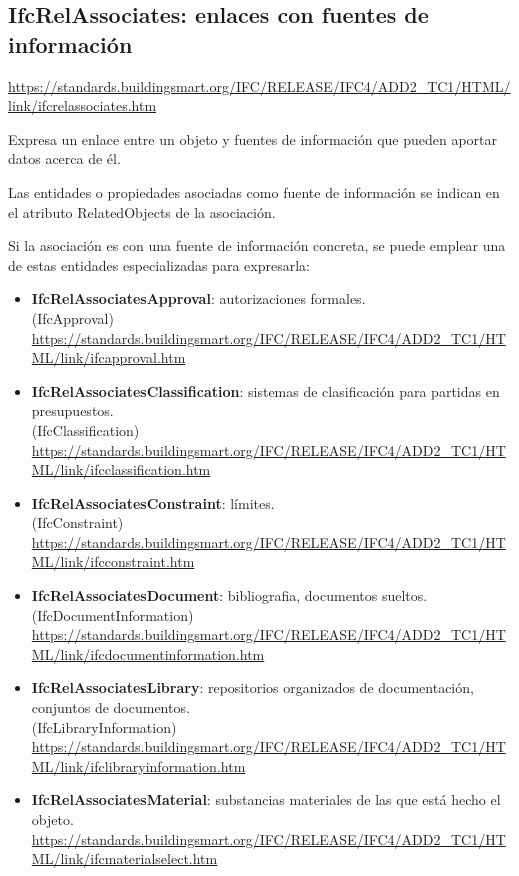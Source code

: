\documentclass[spanish,12pt,a4paper,final,oneside]{book}
\begin{document}
\subsection{IfcRelAssociates: enlaces con fuentes de información}
\url{https://standards.buildingsmart.org/IFC/RELEASE/IFC4/ADD2_TC1/HTML/link/ifcrelassociates.htm}

Expresa un enlace entre un objeto y fuentes de información que pueden aportar datos acerca de él.

Las entidades o propiedades asociadas como fuente de información se indican en el atributo RelatedObjects de la asociación.

Si la asociación es con una fuente de información concreta, se puede emplear una de estas entidades especializadas para expresarla:
\begin{itemize}

\item \textbf{IfcRelAssociatesApproval}: autorizaciones formales.
\\(IfcApproval) \url{https://standards.buildingsmart.org/IFC/RELEASE/IFC4/ADD2_TC1/HTML/link/ifcapproval.htm}

\item \textbf{IfcRelAssociatesClassification}: sistemas de clasificación para partidas en presupuestos.
\\(IfcClassification) \url{https://standards.buildingsmart.org/IFC/RELEASE/IFC4/ADD2_TC1/HTML/link/ifcclassification.htm}

\item \textbf{IfcRelAssociatesConstraint}: límites.
\\(IfcConstraint) \url{https://standards.buildingsmart.org/IFC/RELEASE/IFC4/ADD2_TC1/HTML/link/ifcconstraint.htm}

\item \textbf{IfcRelAssociatesDocument}: bibliografia, documentos sueltos.
\\(IfcDocumentInformation) \url{https://standards.buildingsmart.org/IFC/RELEASE/IFC4/ADD2_TC1/HTML/link/ifcdocumentinformation.htm}

\item \textbf{IfcRelAssociatesLibrary}: repositorios organizados de documentación, conjuntos de documentos.
\\(IfcLibraryInformation) \url{https://standards.buildingsmart.org/IFC/RELEASE/IFC4/ADD2_TC1/HTML/link/ifclibraryinformation.htm}

\item \textbf{IfcRelAssociatesMaterial}: substancias materiales de las que está hecho el objeto.
\\ \url{https://standards.buildingsmart.org/IFC/RELEASE/IFC4/ADD2_TC1/HTML/link/ifcmaterialselect.htm}

\end{itemize}
\end{document}
